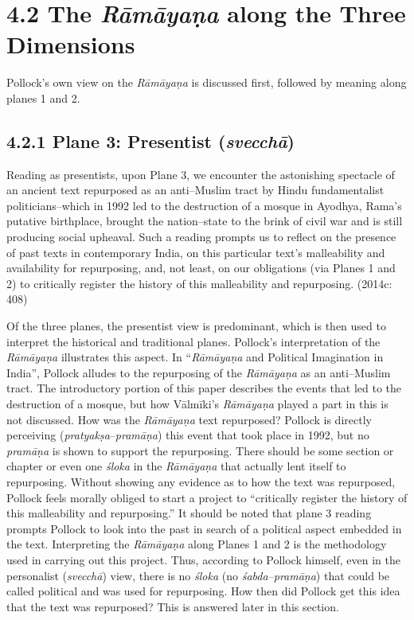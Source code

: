\vspace{-.2cm}

\section*{4.2 The {\it {\bfseries Rāmāyaṇa}} along the Three Dimensions}

Pollock’s own view on the \textit{Rāmāyaṇa} is discussed first, followed by meaning along planes 1 and 2.

\subsection*{4.2.1 Plane 3: Presentist ({\it {\bfseries svecchā}})}

\begin{myquote}
Reading as presentists, upon Plane 3, we encounter the astonishing spectacle of an ancient text repurposed as an anti–Muslim tract by Hindu fundamentalist politicians–which in 1992 led to the destruction of a mosque in Ayodhya, Rama’s putative birthplace, brought the nation–state to the brink of civil war and is still producing social upheaval. Such a reading prompts us to reflect on the presence of past texts in contemporary India, on this particular text’s malleability and availability for repurposing, and, not least, on our obligations (via Planes 1 and 2) to critically register the history of this malleability and repurposing. (2014c: 408)
\end{myquote}

Of the three planes, the presentist view is predominant, which is then used to interpret the historical and traditional planes. Pollock’s interpretation of the \textit{Rāmāyaṇa }illustrates this aspect. In “\textit{Rāmāyaṇa }and Political Imagination in India”, Pollock alludes to the repurposing of the \textit{Rāmāyaṇa }as an anti–Muslim tract. The introductory portion of this paper describes the events that led to the destruction of a mosque, but how Vālmīki’s \textit{ Rāmāyaṇa} played a part in this is not discussed. How was the \textit{Rāmāyaṇa} text repurposed? Pollock is directly perceiving (\textit{pratyakṣa}–\textit{pramāṇa}) this event that took place in 1992, but no \textit{pramāṇa} is shown to support the repurposing. There should be some section or chapter or even one \textit{śloka} in the \textit{Rāmāyaṇa }that actually lent itself to repurposing. Without showing any evidence as to how the text was repurposed, Pollock feels morally obliged to start a project to “critically register the history of this malleability and repurposing.” It should be noted that plane 3 reading prompts Pollock to look into the past in search of a political aspect embedded in the text. Interpreting the \textit{Rāmāyaṇa} along Planes 1 and 2 is the methodology used in carrying out this project. Thus, according to Pollock himself, even in the personalist (\textit{svecchā}) view, there is no \textit{śloka} (no \textit{śabda–pramāṇa}) that could be called political and was used for repurposing. How then did Pollock get this idea that the text was repurposed? This is answered later in this section.

